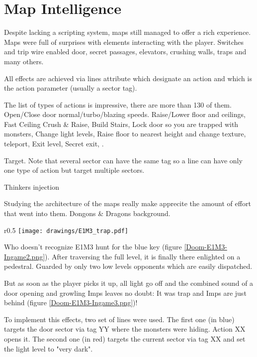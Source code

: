 \section{Map Intelligence}
Despite lacking a scripting system, maps still managed to offer a rich experience. Maps were full of surprises with elements interacting with the player. Switches and trip wire enabled door, secret passages, elevators, crushing walls, traps and many others.\\
\par
{}
\par
All effects are achieved via lines  attribute which designate an action and  which is the action parameter (usually a sector tag).\\
\par
The list of types of actions is impressive, there are more than 130 of them. Open/Close door normal/turbo/blazing speeds. Raise/Lower floor and ceilings, Fast Ceiling Crush \& Raise, Build Stairs, Lock door so you are trapped with monsters, Change light levels, Raise floor to nearest height and change texture, teleport, Exit level, Secret exit,  .\\
\par
Target. Note that several sector can have the same tag so a line can have only one type of action but target multiple sectors.\\
\par
Thinkers injection\\
\par
Studying the architecture of the maps really make apprecite the amount of effort that went into them. Dongons \& Dragons background.
\pagebreak






\begin{wrapfigure}[17]{r}{0.5\textwidth}
\centering
\texttt{[image: drawings/E1M3\_trap.pdf]}
\end{wrapfigure}
Who doesn't recognize E1M3 hunt for the blue key (figure \ref{Doom-E1M3-Ingame2.png}). After traversing the full level, it is finally there enlighted on a pedestral. Guarded by only two low levels opponents which are easily dispatched.\\
\par
But as soon as the player picks it up, all light go off and the combined sound of a door opening and growling Imps leaves no doubt: It was trap and Imps are just behind (figure \ref{Doom-E1M3-Ingame3.png})!\\
\par
To implement this effects, two set of lines were used. The first one (in blue) targets the door sector via tag YY where the monsters were hiding. Action XX opens it. The second one (in red) targets the current sector via tag XX and set the light level to "very dark".\\
\par



